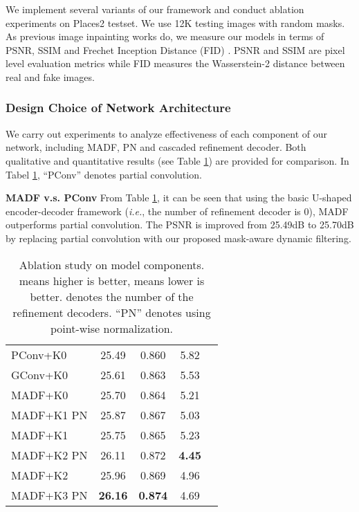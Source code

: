 \documentclass[journal]{IEEEtran}
\begin{document}
We implement several variants of our framework and conduct ablation experiments on Places2 testset. We use 12K testing images with random masks. As previous image inpainting works do, we measure our models in terms of PSNR, SSIM\cite{wang2004image} and Frechet Inception Distance (FID) \cite{heusel2017gans}. PSNR and SSIM are pixel level evaluation metrics while FID measures the Wasserstein-2 distance between real and fake images. \subsubsection{Design Choice of Network Architecture}
We carry out experiments to analyze effectiveness of each component of our network, including MADF, PN and cascaded refinement decoder. Both qualitative and quantitative results (see Table \ref{tb:num_of_refine_d}) are provided for comparison. In Tabel \ref{tb:num_of_refine_d}, ``PConv'' denotes partial convolution.

\textbf{MADF v.s. PConv}
From Table \ref{tb:num_of_refine_d},  it can be seen that using the basic U-shaped encoder-decoder framework (\emph{i.e.}, the number of refinement decoder is 0), MADF outperforms partial convolution.
The PSNR is improved from 25.49dB to 25.70dB by replacing partial convolution with our proposed mask-aware dynamic filtering. 

\begin{table}[t]
\caption{Ablation study on model components.  means higher is better,  means lower is better.  denotes the number of the refinement decoders. ``PN'' denotes using point-wise normalization. 
}
\label{tb:num_of_refine_d}
\centering
\begin{tabular}{lcccc} \hline
 &   &  &  	\\ \hline
\hline
PConv+K0 & 25.49 & 0.860 & 5.82 \\
GConv+K0 & 25.61 & 0.863 & 5.53 \\
MADF+K0 & 25.70 & 0.864 &  5.21 \\
MADF+K1 PN& 25.87 & 0.867 & 5.03 \\
MADF+K1 & 25.75 & 0.865 & 5.23 \\
MADF+K2 PN& 26.11 & 0.872 & \textbf{4.45} \\
MADF+K2 & 25.96 & 0.869 & 4.96 \\
MADF+K3 PN& \textbf{26.16} & \textbf{0.874} & 4.69 \\
\hline
\end{tabular}
\end{table}
\end{document}
